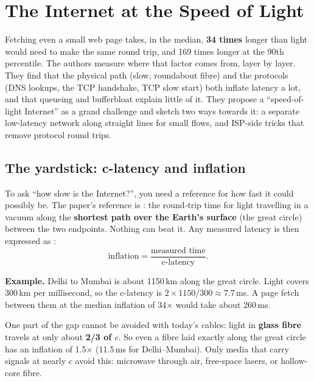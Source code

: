 \chapter{The Internet at the Speed of Light}

\begin{keybox}
Fetching even a small web page takes, in the median, \textbf{34 times} longer than light would need to make the same round trip, and 169 times longer at the
90th percentile. The authors measure where that factor comes from, layer by layer. They find that the physical path (slow, roundabout fibre) and the
protocols (DNS lookups, the TCP handshake, TCP slow start) both inflate latency a lot, and that queueing and bufferbloat explain little of it. They propose a
``speed-of-light Internet'' as a grand challenge and sketch two ways towards it: a separate low-latency network along straight lines for small flows, and
ISP-side tricks that remove protocol round trips.
\end{keybox}

\section{The yardstick: c-latency and inflation}

To ask ``how slow is the Internet?'', you need a reference for how fast it could possibly be. The paper's reference is : the
round-trip time for light travelling in a vacuum along the \textbf{shortest path over the Earth's surface} (the great circle) between the two endpoints.
Nothing can beat it. Any measured latency is then expressed as :
\[
  \text{inflation} = \frac{\text{measured time}}{\text{c-latency}}.
\]

\textbf{Example.} Delhi to Mumbai is about 1150\,km along the great circle. Light covers 300\,km per millisecond, so the c-latency is
$2 \times 1150 / 300 \approx 7.7$\,ms. A page fetch between them at the median inflation of 34$\times$ would take about 260\,ms.

One part of the gap cannot be avoided with today's cables: light in \textbf{glass fibre} travels at only about \textbf{2/3 of $c$}. So even a fibre laid exactly
along the great circle has an inflation of 1.5$\times$ (11.5\,ms for Delhi--Mumbai). Only media that carry signals at nearly $c$ avoid this: microwave through
air, free-space lasers, or hollow-core fibre.

